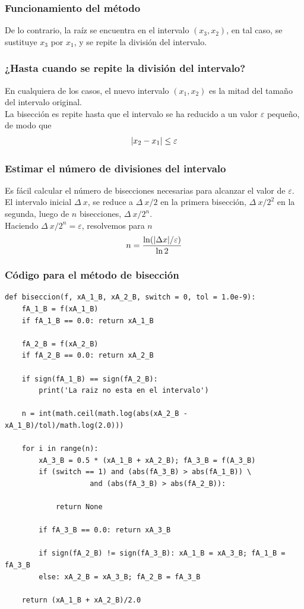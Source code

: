 \begin{frame}
\frametitle{Funcionamiento del método}
De lo contrario, la raíz se encuentra en el intervalo $(x_{3}, x_{2})$, en tal caso, se sustituye $x_{3}$ por $x_{1}$, y se repite la división del intervalo.
\end{frame}
\begin{frame}
\frametitle{¿Hasta cuando se repite la división del intervalo?}
En cualquiera de los casos, el nuevo intervalo $(x_{1}, x_{2})$ es la mitad del tamaño del intervalo original.
\\
\bigskip
La bisección es repite hasta que el intervalo se ha reducido a un valor $\varepsilon$ pequeño, de modo que
\begin{align*}
\abs{x_{2} - x_{1}} \leq \varepsilon
\end{align*}
\end{frame}
\begin{frame}
\frametitle{Estimar el número de divisiones del intervalo}
Es fácil calcular el número de bisecciones necesarias para alcanzar el valor de $\varepsilon$.
\\
\bigskip
\pause
El intervalo inicial $\Delta \: x$, se reduce a $\Delta \: x /2$ en la primera bisección, $\Delta \: x /2^{2}$ en la segunda, luego de $n$ bisecciones, $\Delta \: x /2^{n}$.
\\
\bigskip
\pause
Haciendo $\Delta \: x /2^{n} = \varepsilon$, resolvemos para $n$
\begin{align*}
n = \dfrac{\ln(\abs{\Delta x} / \varepsilon)}{\ln 2}
\end{align*}
\end{frame}
\begin{frame}
\frametitle{Código para el método de bisección}
\begin{lstlisting}[caption=Método de bisección con \python, style=codigopython]
def biseccion(f, xA_1_B, xA_2_B, switch = 0, tol = 1.0e-9):
    fA_1_B = f(xA_1_B)
    if fA_1_B == 0.0: return xA_1_B
    
    fA_2_B = f(xA_2_B)
    if fA_2_B == 0.0: return xA_2_B
    
    if sign(fA_1_B) == sign(fA_2_B):
        print('La raiz no esta en el intervalo')

    n = int(math.ceil(math.log(abs(xA_2_B - xA_1_B)/tol)/math.log(2.0)))
    
    for i in range(n):
        xA_3_B = 0.5 * (xA_1_B + xA_2_B); fA_3_B = f(A_3_B)
        if (switch == 1) and (abs(fA_3_B) > abs(fA_1_B)) \
                    and (abs(fA_3_B) > abs(fA_2_B)):
                        
            return None
        
        if fA_3_B == 0.0: return xA_3_B

        if sign(fA_2_B) != sign(fA_3_B): xA_1_B = xA_3_B; fA_1_B = fA_3_B
        else: xA_2_B = xA_3_B; fA_2_B = fA_3_B
    
    return (xA_1_B + xA_2_B)/2.0
\end{lstlisting}
\end{frame}
